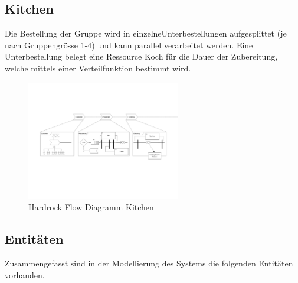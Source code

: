 \documentclass[ngerman,a4paper,12pt]{scrreprt}
\begin{document}
\begin{landscape}
		\subsection{Kitchen}
		Die Bestellung der Gruppe wird in einzelneUnterbestellungen aufgesplittet (je nach Gruppengrösse 1-4) und kann parallel verarbeitet werden. Eine Unterbestellung belegt eine Ressource Koch für die Dauer der Zubereitung, welche mittels einer Verteilfunktion bestimmt wird.
		
		\begin{figure}[H]
			\begin{center}
					\includegraphics[page=3,trim=2cm 12cm 12cm 2cm, clip=true,width=0.6\textwidth]{../model/Modell_v2.pdf}
					\caption[Hardrock Flow Diagramm Kitchen]{Hardrock Flow Diagramm Kitchen}
					\label{flowDiagrammKitchen}
			\end{center}
		\end{figure}
		
		
\end{landscape}

		\subsection{Entitäten}
		Zusammengefasst sind in der Modellierung des Systems die folgenden Entitäten vorhanden.
		
\end{document}
